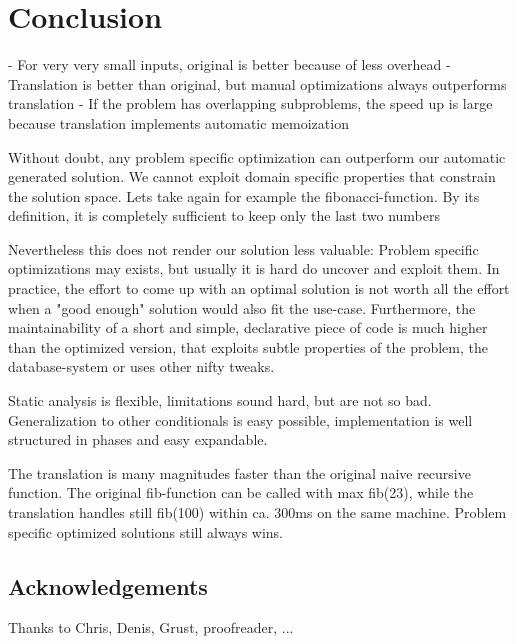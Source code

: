 \chapter{Conclusion} \label{conclusion}


- For very very small inputs, original is better because of less overhead
- Translation is better than original, but manual optimizations always outperforms translation
- If the problem has overlapping subproblems, the speed up is large because translation implements automatic memoization


Without doubt, any problem specific optimization can outperform our automatic generated solution. We cannot exploit domain specific properties that constrain the solution space. Lets take again for example the fibonacci-function. By its definition, it is completely sufficient to keep only the last two numbers 

Nevertheless this does not render our solution less valuable: Problem specific optimizations may exists, but usually it is hard do uncover and exploit them. In practice, the effort to come up with an optimal solution is not worth all the effort when a "good enough" solution would also fit the use-case. Furthermore, the maintainability of a short and simple, declarative piece of code is much higher than the optimized version, that exploits subtle properties of the problem, the database-system or uses other nifty tweaks.


Static analysis is flexible, limitations sound hard, but are not so bad. Generalization to other conditionals is easy possible, implementation is well structured in phases and easy expandable.

The translation is many magnitudes faster than the original naive recursive function. The original fib-function can be called with max fib(23), while the translation handles still fib(100) within ca. 300ms on the same machine. Problem specific optimized solutions still always wins.


\section*{Acknowledgements}
Thanks to Chris, Denis, Grust, proofreader, ...